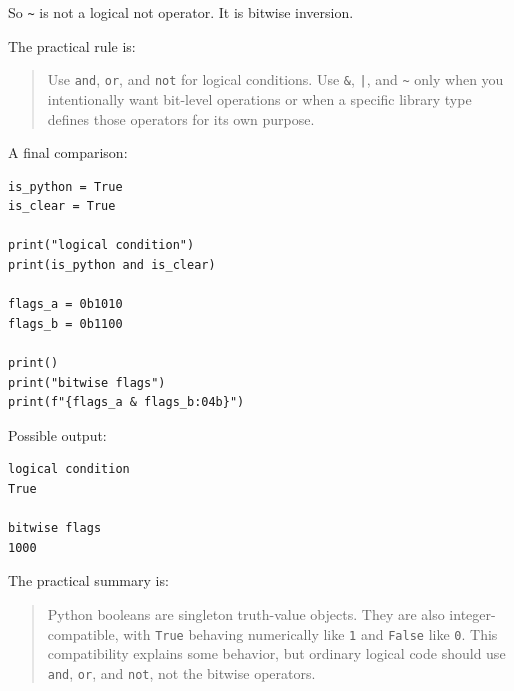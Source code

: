 So \texttt{\textasciitilde{}} is not a logical not operator. It is bitwise inversion.

The practical rule is:

\begin{quote}
Use \texttt{and}, \texttt{or}, and \texttt{not} for logical conditions. Use \texttt{\&}, \texttt{|}, and \texttt{\textasciitilde{}} only when you intentionally want bit-level operations or when a specific library type defines those operators for its own purpose.
\end{quote}

A final comparison:

\begin{verbatim}
is_python = True
is_clear = True

print("logical condition")
print(is_python and is_clear)

flags_a = 0b1010
flags_b = 0b1100

print()
print("bitwise flags")
print(f"{flags_a & flags_b:04b}")
\end{verbatim}

Possible output:

\begin{verbatim}
logical condition
True

bitwise flags
1000
\end{verbatim}

The practical summary is:

\begin{quote}
Python booleans are singleton truth-value objects. They are also integer-compatible, with \texttt{True} behaving numerically like \texttt{1} and \texttt{False} like \texttt{0}. This compatibility explains some behavior, but ordinary logical code should use \texttt{and}, \texttt{or}, and \texttt{not}, not the bitwise operators.
\end{quote}